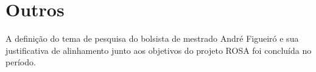 

\section{Outros}
\label{outros}

A definição do tema de pesquisa do bolsista de mestrado André Figueiró e sua justificativa de alinhamento junto aos objetivos do projeto ROSA foi concluída no período. 
